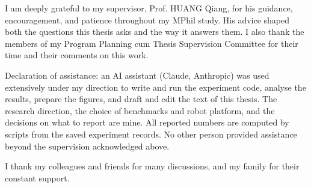 I am deeply grateful to my supervisor, Prof. HUANG Qiang, for his guidance, encouragement, and patience throughout
my MPhil study. His advice shaped both the questions this thesis asks and the way it answers them. I also thank the
members of my Program Planning cum Thesis Supervision Committee for their time and their comments on this work.

Declaration of assistance: an AI assistant (Claude, Anthropic) was used extensively under my direction to write
and run the experiment code, analyse the results, prepare the figures, and draft and edit the text of this
thesis. The research direction, the choice of benchmarks and robot platform, and the decisions on what to report
are mine. All reported numbers are computed by scripts from the saved experiment records. No other person
provided assistance beyond the supervision acknowledged above.

I thank my colleagues and friends for many discussions, and my family for their constant support.
